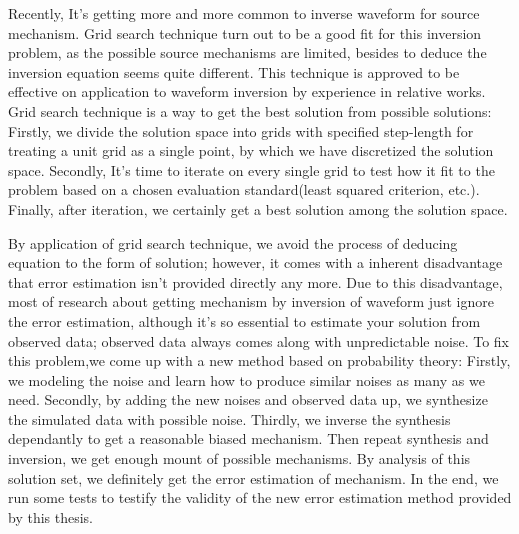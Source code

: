 \vspace{1em}\par\vfill





\begin{enabstract}
Recently, It's getting more and more common to inverse waveform for source mechanism. Grid search technique turn out to be a good fit for this inversion problem, as the possible source mechanisms are limited, besides to deduce the inversion equation seems quite different. This technique is approved to be effective on application to waveform inversion by experience in relative works. Grid search technique is a way to get the best solution from possible solutions: Firstly, we divide the solution space into grids with specified step-length for treating a unit grid as a single point, by which we have discretized the solution space. Secondly, It's time to iterate on every single grid to test how it fit to the problem based on a chosen evaluation standard(least squared criterion, etc.). Finally, after iteration, we certainly get a best solution among the solution space.

By application of grid search technique, we avoid the process of deducing equation to the form of solution; however, it comes with a inherent disadvantage that error estimation isn't provided directly any more. Due to this disadvantage, most of research about getting mechanism by inversion of waveform just ignore the error estimation, although it's so essential to estimate your solution from observed data; observed data always comes along with unpredictable noise. To fix this problem,we come up with a new method based on probability theory: Firstly, we modeling the noise and learn how to produce similar noises as many as we need. Secondly, by adding the new noises and observed data up, we synthesize the simulated data with possible noise. Thirdly, we inverse the synthesis dependantly to get a reasonable biased mechanism. Then repeat synthesis and inversion, we get enough mount of possible mechanisms. By analysis of this solution set, we definitely get the error estimation of mechanism. In the end, we run some tests to testify the validity of the new error estimation method provided by this thesis.


\end{enabstract}
